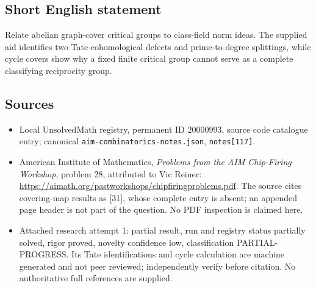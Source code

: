 \documentclass[11pt]{article}
\begin{document}
\subsection{Short English statement}
Relate abelian graph-cover critical groups to class-field norm ideas. The supplied aid identifies two Tate-cohomological defects and prime-to-degree splittings, while cycle covers show why a fixed finite critical group cannot serve as a complete classifying reciprocity group.
\subsection{Sources}
\begin{itemize}
\item Local UnsolvedMath registry, permanent ID $20000993$, source code catalogue entry; canonical \texttt{aim-combinatorics-notes.json}, \texttt{notes[117]}.
\item American Institute of Mathematics, \emph{Problems from the AIM Chip-Firing Workshop}, problem 28, attributed to Vic Reiner: \url{https://aimath.org/pastworkshops/chipfiringproblems.pdf}. The source cites covering-map results as [31], whose complete entry is absent; an appended page header is not part of the question. No PDF inspection is claimed here.
\item Attached research attempt 1: partial result, run and registry status partially solved, rigor proved, novelty confidence low, classification PARTIAL-PROGRESS. Its Tate identifications and cycle calculation are machine generated and not peer reviewed; independently verify before citation. No authoritative full references are supplied.
\end{itemize}
\end{document}
